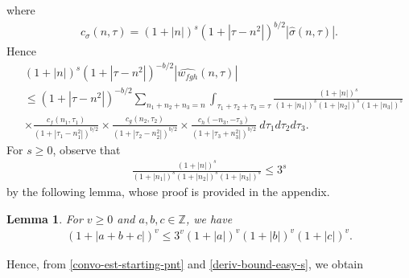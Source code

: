 \documentclass[12pt,reqno]{amsart}
\numberwithin{equation}{section}  %
\numberwithin{figure}{section}
\newcommand{\zz}{\mathbb{Z}}
\newcommand{\wh}{\widehat}
\theoremstyle{plain}
\newtheorem{lemma}{Lemma}
\theoremstyle{definition}
\theoremstyle{remark}
\begin{document}
%
%
where 
%
%
\begin{equation*}
  \begin{split}
    c_\sigma(n, \tau) = \left (1 + |n| \right ) ^s \left( 1 + | \tau - n^{2} |  
    \right)^{b/2} | \wh{\sigma}\left( n, \tau \right) | .
  \end{split}
\end{equation*}
%
%
Hence
%
%
\begin{equation}
  \label{convo-est-starting-pnt}
  \begin{split}
     & \left (1 + |n| \right )^s \left( 1 + | \tau - n^{2} | \right)^{-b/2} | \wh{{w}_{fgh}}\left( 
    n, \tau \right) |
    \\
    & \le \left( 1 + | \tau - n^{2} | \right)^{-b/2}
    \sum_{n_1 + n_2 + n_3 = n} \int_{\tau_1 + \tau_2 + \tau_3 = \tau} \frac{\left (1 + |n| \right )^s}{\left (1 +
    |n_1| \right )^s \left (1 + | n_2| \right )^s \left (1 + |n_3| \right )^s} 
    \\
    & \times \frac{c_f(n_1, \tau_1)}{\left( 1 + | \tau_1 - n_1^2 | 
    \right)^{b/2}}
    \times
    \frac{c_g(n_2, \tau_2)}{\left( 1 + | \tau_2 - n_2^2 | 
    \right)^{b/2}} \times
    \frac{c_h(-n_3, -\tau_3)}{\left( 1 + | \tau_3 + n_3^2 | 
    \right)^{b/2}}\ d \tau_1 d \tau_2 d \tau_3.
  \end{split}
\end{equation}
%
%
For $s \ge 0$, observe that
%
%
\begin{equation}
  \label{deriv-bound-easy-s}
  \begin{split}
    \frac{\left (1 + |n| \right ) ^s}{\left (1 + |n_1| \right ) ^s \left (1 + |n_2| \right ) ^s \left (1 + |n_3| \right ) ^s} 
    \le 3^{s}
  \end{split}
\end{equation}
%
%
by the following lemma, whose proof is provided in the appendix.
%
%
\begin{lemma}
\label{lem:splitting}
  For $v \ge 0$ and $a, b, c \in \zz$, we have
%
%
\begin{equation}
  \label{splitting}
  \begin{split}
    \left ( 1 + |a +b + c| \right)^v \le 3^v \left(1 + | a | \right)^v \left(
    1 + | b | \right)^v \left( 1 + | c | \right)^v.
  \end{split}
\end{equation}
%
%
\end{lemma}
%
%
Hence, from \eqref{convo-est-starting-pnt} and \eqref{deriv-bound-easy-s}, we 
obtain
%
\end{document}
